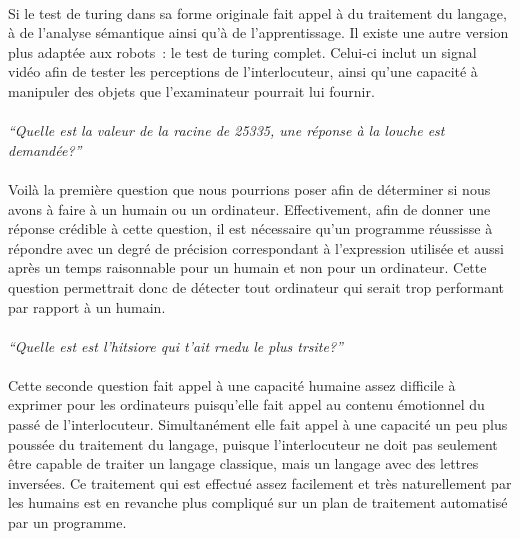 \paragraph{}
Si le test de turing dans sa forme originale fait appel à du traitement du
langage, à de l'analyse sémantique ainsi qu'à de l'apprentissage. Il existe une
autre version plus adaptée aux robots~: le test de turing complet. Celui-ci
inclut un signal vidéo afin de tester les perceptions de l'interlocuteur, ainsi
qu'une capacité à manipuler des objets que l'examinateur pourrait lui fournir.

\paragraph{}
\begin{centering}
  {\em ``Quelle est la valeur de la racine de 25335, une réponse à la louche est
    demandée?''}
\end{centering}

\paragraph{}
Voilà la première question que nous pourrions poser afin de déterminer si nous
avons à faire à un humain ou un ordinateur. Effectivement, afin de donner une
réponse crédible à cette question, il est nécessaire qu'un programme réussisse
à répondre avec un degré de précision correspondant à l'expression utilisée et
aussi après un temps raisonnable pour un humain et non pour un ordinateur. Cette
question permettrait donc de détecter tout ordinateur qui serait trop performant
par rapport à un humain.

\paragraph{}
\begin{centering}
  {\em ``Quelle est est l'hitsiore qui t'ait rnedu le plus trsite?''}
\end{centering}

\paragraph{}
Cette seconde question fait appel à une capacité humaine assez difficile à
exprimer pour les ordinateurs puisqu'elle fait appel au contenu émotionnel du
passé de l'interlocuteur. Simultanément elle fait appel à une capacité un peu
plus poussée du traitement du langage, puisque l'interlocuteur ne doit pas
seulement être capable de traiter un langage classique, mais un langage avec des
lettres inversées. Ce traitement qui est effectué assez facilement et très
naturellement par les humains est en revanche plus compliqué sur un plan
de traitement automatisé par un programme.


